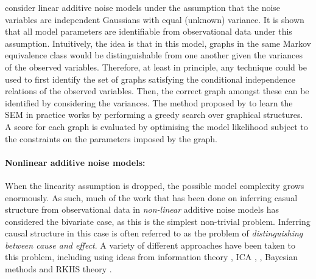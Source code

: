\cite{peters2013identifiability} consider linear additive noise models under the assumption that the noise variables are independent Gaussians with equal (unknown) variance.
It is shown that all model parameters are identifiable from observational data under this assumption. 
Intuitively, the idea is that in this model, graphs in the same Markov equivalence class would be distinguishable from one another given the variances of the observed variables. 
Therefore, at least in principle, any technique could be used to first identify the set of graphs satisfying the conditional independence relations of the observed variables. 
Then, the correct graph amongst these can be identified by considering the variances. 
The method proposed by \cite{peters2013identifiability} to learn the SEM in practice works by performing a greedy search over graphical structures. 
A score for each graph is evaluated by optimising the model likelihood subject to the constraints on the parameters imposed by the graph.

\paragraph{Nonlinear additive noise models:}
When the linearity assumption is dropped, the possible model complexity grows enormously. As such, much of the work that has been done on inferring casual structure from observational data in \emph{non-linear} additive noise models has considered the bivariate case, as this is the simplest non-trivial problem. Inferring causal structure in this case is often referred to as the problem of \emph{distinguishing between cause and effect}. A variety of different approaches have been taken to this problem, including using ideas from information theory \cite{janzing2012information} \cite{janzing2010causal} \cite{janzing2009telling}, ICA \cite{hyvarinen2013pairwise}, \cite{zhang2008distinguishing}, Bayesian methods \cite{mooij2010distinguishing} \cite{stegle2010probabilistic} and RKHS theory \cite{lopez2015towards}.


